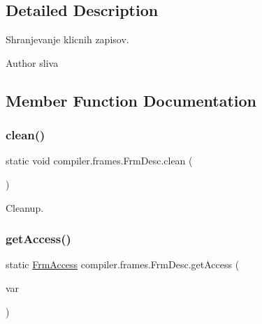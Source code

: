 \subsection{Detailed Description}
Shranjevanje klicnih zapisov.

\begin{DoxyAuthor}{Author}
sliva 
\end{DoxyAuthor}


\subsection{Member Function Documentation}
\mbox{\label{classcompiler_1_1frames_1_1_frm_desc_a59b6355f8d235a0c1d9b6293ece69850}} 
\subsubsection{\texorpdfstring{clean()}{clean()}}
{\footnotesize\ttfamily static void compiler.\+frames.\+Frm\+Desc.\+clean (\begin{DoxyParamCaption}{ }\end{DoxyParamCaption})\hspace{0.3cm}{\ttfamily [static]}}

Cleanup. \mbox{\label{classcompiler_1_1frames_1_1_frm_desc_a609f7edf099f5347df87b10678edbd50}} 
\subsubsection{\texorpdfstring{get\+Access()}{getAccess()}}
{\footnotesize\ttfamily static \hyperlink{interfacecompiler_1_1frames_1_1_frm_access}{Frm\+Access} compiler.\+frames.\+Frm\+Desc.\+get\+Access (\begin{DoxyParamCaption}\item[{\hyperlink{classcompiler_1_1abstr_1_1tree_1_1def_1_1_abs_def}{Abs\+Def}}]{var }\end{DoxyParamCaption})\hspace{0.3cm}{\ttfamily [static]}}

